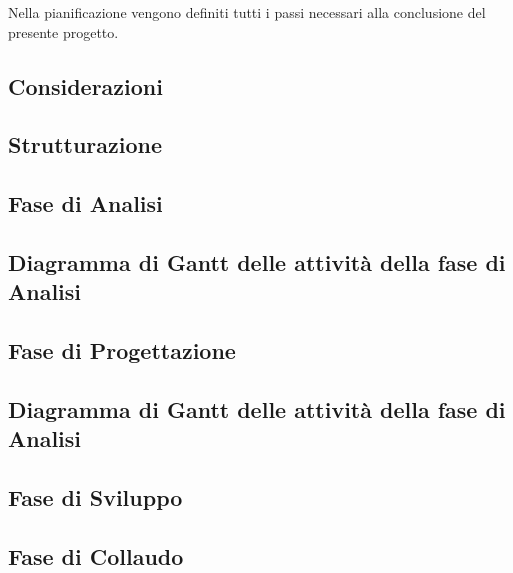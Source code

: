 Nella pianificazione vengono definiti tutti i passi necessari alla conclusione del presente progetto.

\subsection{Considerazioni}\label{sec:Considerazioni}


\subsection{Strutturazione}\label{sec:Strutturazione}

\newpage
\subsection{Fase di Analisi}\label{sec:Periodo 1 Analisi}

\subsection{Diagramma di Gantt delle attività della fase di Analisi}\label{sec:Gant Analisi}


\subsection{Fase di Progettazione}\label{Progettazione}

\subsection{Diagramma di Gantt delle attività della fase di Analisi}\label{sec:Gant Analisi}

    
\subsection{Fase di Sviluppo}\label{sec:Sviluppo}

    
\subsection{Fase di Collaudo}\label{sec:Collaudo}
